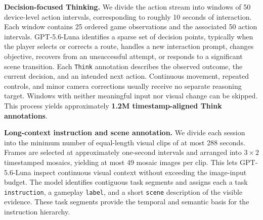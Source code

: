 \textbf{Decision-focused Thinking.}
We divide the action stream into windows of 50 device-level action intervals, corresponding to roughly 10 seconds of interaction. Each window contains 25 ordered game observations and the associated 50 action intervals. GPT-5.6-Luna identifies a sparse set of decision points, typically when the player selects or corrects a route, handles a new interaction prompt, changes objective, recovers from an unsuccessful attempt, or responds to a significant scene transition. Each \texttt{Think} annotation describes the observed outcome, the current decision, and an intended next action. Continuous movement, repeated controls, and minor camera corrections usually receive no separate reasoning target. Windows with neither meaningful input nor visual change can be skipped.
This process yields approximately \textbf{1.2M timestamp-aligned Think annotations}.

\textbf{Long-context instruction and scene annotation.}
We divide each session into the minimum number of equal-length visual clips of at most 288 seconds.
Frames are selected at approximately one-second intervals and arranged into $3\times2$ timestamped mosaics, yielding at most 49 mosaic images per clip. This lets GPT-5.6-Luna inspect continuous visual context without exceeding the image-input budget. The model identifies contiguous task segments and assigns each a task \texttt{instruction}, a gameplay \texttt{label}, and a short \texttt{scene} description of the visible evidence. These task segments provide the temporal and semantic basis for the instruction hierarchy.


